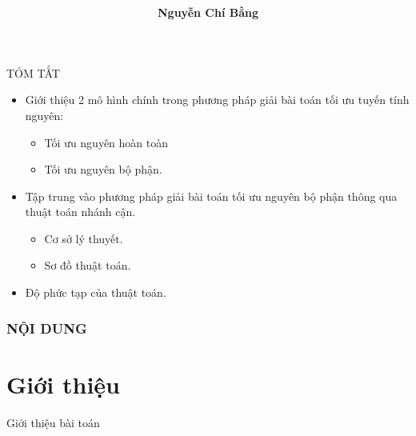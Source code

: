 \documentclass{beamer}
\title[]{\fontsize{13pt}{10pt}\selectfont {\bf \LARGE Phương pháp nhánh cận}\\}
\author[]{\bf Nguyễn Chí Bằng \\}
\begin{document}
\begin{frame}

\titlepage
\end{frame}

\begin{frame}{TÓM TẮT}
\begin{itemize}
\item Giới thiệu 2 mô hình chính trong phương pháp giải bài toán tối ưu tuyến tính nguyên:
\begin{itemize}
\item Tối ưu nguyên hoàn toàn
\item Tối ưu nguyên bộ phận.
\end{itemize}
\item Tập trung vào phương pháp giải bài toán tối ưu nguyên bộ phận thông qua thuật toán nhánh cận.
\begin{itemize}
\item Cơ sở lý thuyết.
\item Sơ đồ thuật toán.
\end{itemize}
\item Độ phức tạp của thuật toán.
\end{itemize}
\end{frame}

\begin{frame}
    \frametitle{NỘI DUNG}
    \tableofcontents
\end{frame}

\section{Giới thiệu}

\begin{frame}
   \center 
   \huge Giới thiệu bài toán 
\end{frame}
\end{document}
